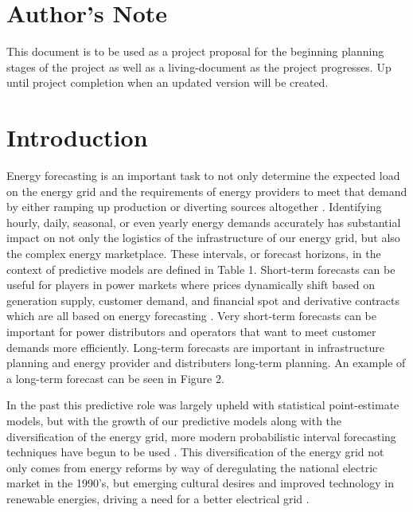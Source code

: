 \documentclass[sigconf]{acmart}
\begin{document}
\maketitle

\section{Author's Note}
This document is to be used as a project proposal for the beginning planning stages of the project as well as a living-document as the project progresses. Up until project completion when an updated version will be created.

\section{Introduction}
Energy forecasting is an important task to not only determine the expected load on the energy grid and the requirements of energy providers to meet that demand by either ramping up production or diverting sources altogether \cite{Hong16}. Identifying hourly, daily, seasonal, or even yearly energy demands accurately has substantial impact on not only the logistics of the infrastructure of our energy grid, but also the complex energy marketplace. These intervals, or forecast horizons, in the context of predictive models are defined in Table 1. Short-term forecasts can be useful for players in power markets where prices dynamically shift based on generation supply, customer demand, and financial spot and derivative contracts which are all based on energy forecasting \cite{Bunn04}. Very short-term forecasts can be important for power distributors and operators that want to meet customer demands more efficiently. Long-term forecasts are important in infrastructure planning and energy provider and distributers long-term planning. An example of a long-term forecast can be seen in Figure 2.

In the past this predictive role was largely upheld with statistical point-estimate models, but with the growth of our predictive models along with the diversification of the energy grid, more modern probabilistic interval forecasting techniques have begun to be used \cite{Lee21, Weron14, Hong16}. This diversification of the energy grid not only comes from energy reforms by way of deregulating the national electric market in the 1990's, but emerging cultural desires and improved technology in renewable energies, driving a need for a better electrical grid \cite{Joskow01}.
\end{document}

